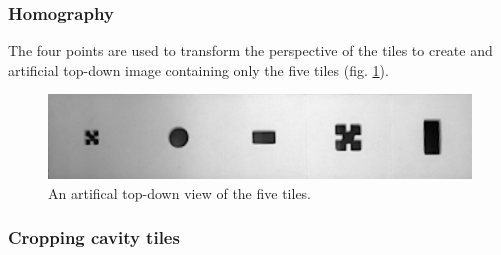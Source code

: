\documentclass{article}
\begin{document}
\subsubsection*{Homography}
The four points are used to transform the perspective of the tiles to create and artificial top-down image containing only the five tiles (fig. \ref{fig:homograph}).\\
\begin{figure}[h!]
\centering
\includegraphics[scale=0.3]{images/homography.jpg}
\caption{An artifical top-down view of the five tiles.}
\label{fig:homograph}
\end{figure}

\subsubsection*{Cropping cavity tiles}
\end{document}
